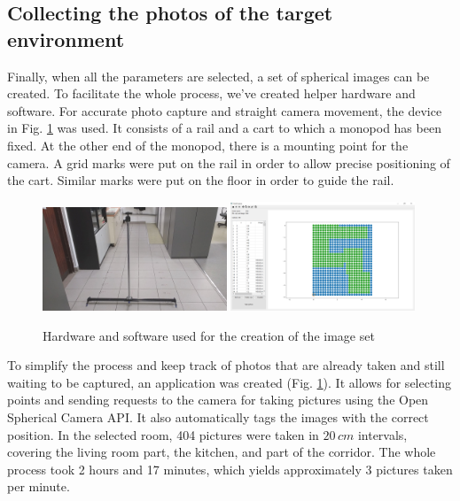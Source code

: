\documentclass{svproc}
\begin{document}
\subsection{Collecting the photos of the target environment}

Finally, when all the parameters are selected, a set of spherical images can be created.
To facilitate the whole process, we've created helper hardware and software.
For accurate photo capture and straight camera movement, the device in Fig. \ref{fig:rig} was used.
It consists of a rail and a cart to which a monopod has been fixed.
At the other end of the monopod, there is a mounting point for the camera.
A grid marks were put on the rail in order to allow precise positioning of the cart.
Similar marks were put on the floor in order to guide the rail.


\begin{figure}[!ht]
    \centering
    \includegraphics[width=0.49\textwidth]{img/rig/calosc.jpg}\hfill%
    \includegraphics[width=0.49\textwidth]{img/creator.png}\\
    \caption{Hardware and software used for the creation of the image set}
    \label{fig:rig}
\end{figure}

To simplify the process and keep track of photos that are already taken and still waiting to 
be captured, an application was created (Fig. \ref{fig:rig}).
It allows for selecting points and sending requests to the camera for taking pictures using the
Open Spherical Camera API. It also automatically tags the images with the correct position.
In the selected room, 404 pictures were taken in $20\,cm$ intervals, covering the living room part,
the kitchen, and part of the corridor. The whole process took 2 hours and 17 minutes,
which yields approximately 3 pictures taken per minute. 
\end{document}
